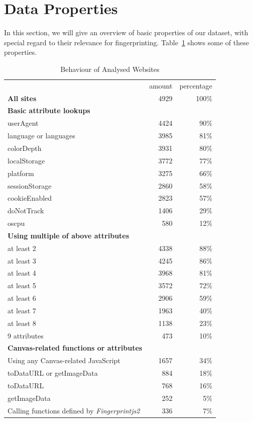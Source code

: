 \documentclass[
    fontsize=12pt,
    headings=small,
    parskip=half,
    bibliography=totoc,
    numbers=noenddot,
    open=any
    ]{scrreprt}
\begin{document}
\section{Data Properties}
\label{section:data_properties}
In this section, we will give an overview of basic properties of our dataset,
with special regard to their relevance for fingerprinting.
Table~\ref{table:dataprops} shows some of these properties.

\renewcommand{\arraystretch}{1.2}
\begin{table}
\centering
\caption{Behaviour of Analysed Websites}
\begin{tabular}{l r r}
    \toprule
    & amount & percentage \\
    \textbf{All sites} & 4929 & 100\% \\
    \midrule
    \textbf{Basic attribute lookups} & & \\
    userAgent & 4424 & 90\% \\ %
    language or languages & 3985 & 81\% \\ %
    colorDepth & 3931 & 80\% \\ %
    localStorage & 3772 & 77\% \\
    platform & 3275 & 66\% \\ %
    sessionStorage & 2860 & 58\% \\
    cookieEnabled & 2823 & 57\% \\ %
    doNotTrack & 1406 & 29\% \\ %
    oscpu & 580 & 12\% \\ %
    \midrule
    \textbf{Using multiple of above attributes} & & \\
    at least 2 & 4338 & 88\% \\
    at least 3 & 4245 & 86\% \\
    at least 4 & 3968 & 81\% \\
    at least 5 & 3572 & 72\% \\
    at least 6 & 2906 & 59\% \\
    at least 7 & 1963 & 40\% \\
    at least 8 & 1138 & 23\% \\
    9 attributes & 473 & 10\% \\
    \midrule
    \textbf{Canvas-related functions or attributes} & & \\
    Using any Canvas-related JavaScript & 1657 & 34\% \\ %
    toDataURL or getImageData & 884 & 18\% \\ %
    toDataURL & 768 & 16\% \\ %
    getImageData & 252 & 5\% \\ %
    \midrule
    Calling functions defined by \textit{Fingerprintjs2} & 336 & 7\% \\ %
    \bottomrule
\end{tabular}
\label{table:dataprops}
\end{table}
\end{document}
